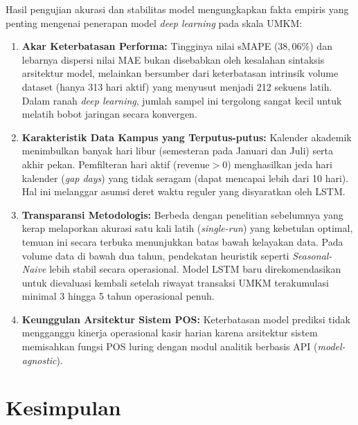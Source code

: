 \documentclass[10pt,a4paper]{article}
\begin{document}
Hasil pengujian akurasi dan stabilitas model mengungkapkan fakta empiris yang penting mengenai penerapan model \textit{deep learning} pada skala UMKM:
\begin{enumerate}
  \item \textbf{Akar Keterbatasan Performa:} Tingginya nilai sMAPE ($38,06\%$) dan lebarnya dispersi nilai MAE bukan disebabkan oleh kesalahan sintaksis arsitektur model, melainkan bersumber dari keterbatasan intrinsik volume dataset (hanya 313 hari aktif) yang menyusut menjadi 212 sekuens latih. Dalam ranah \textit{deep learning}, jumlah sampel ini tergolong sangat kecil untuk melatih bobot jaringan secara konvergen.
  \item \textbf{Karakteristik Data Kampus yang Terputus-putus:} Kalender akademik menimbulkan banyak hari libur (semesteran pada Januari dan Juli) serta akhir pekan. Pemfilteran hari aktif ($\text{revenue} > 0$) menghasilkan jeda hari kalender (\textit{gap days}) yang tidak seragam (dapat mencapai lebih dari 10 hari). Hal ini melanggar asumsi deret waktu reguler yang disyaratkan oleh LSTM.
  \item \textbf{Transparansi Metodologis:} Berbeda dengan penelitian sebelumnya yang kerap melaporkan akurasi satu kali latih (\textit{single-run}) yang kebetulan optimal, temuan ini secara terbuka menunjukkan batas bawah kelayakan data. Pada volume data di bawah dua tahun, pendekatan heuristik seperti \textit{Seasonal-Naive} lebih stabil secara operasional. Model LSTM baru direkomendasikan untuk dievaluasi kembali setelah riwayat transaksi UMKM terakumulasi minimal 3 hingga 5 tahun operasional penuh.
  \item \textbf{Keunggulan Arsitektur Sistem POS:} Keterbatasan model prediksi tidak mengganggu kinerja operasional kasir harian karena arsitektur sistem memisahkan fungsi POS luring dengan modul analitik berbasis API (\textit{model-agnostic}).
\end{enumerate}

\section{Kesimpulan}
\end{document}
